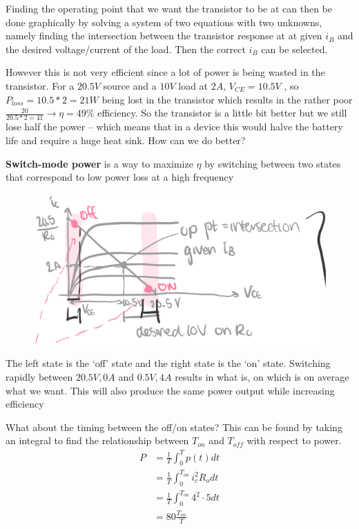 \documentclass[../notes.tex]{subfiles}
\begin{document}
Finding the operating point that we want the transistor to be at can then be done graphically by solving a system of two equations with two unknowns, namely finding the intersection between the transistor response at at given $ i_B $ and the desired voltage/current of the load. 
Then the correct $ i_B $ can be selected.

However this is not very efficient since a lot of power is being wasted in the transistor. For a $ 20.5V $ source and a $ 10V $   load at $ 2A $, $ V_{CE} = 10.5V$ , so $ P_{loss} = 10.5 * 2 = 21W $  being lost in the transistor which results in the rather poor $ \frac{20}{20.5 * 2 = 41} \rightarrow \eta = 49\%$  efficiency.
So the transistor is a little bit better but we still lose half the power -- which means that in a device this would halve the battery life and require a huge heat sink. How can we do better?



\textbf{Switch-mode power} is a way to maximize $ \eta $  by switching between two states that correspond to low power loss at a high frequency

\begin{figure}[H]
	\centering
	\includegraphics[width=0.8\linewidth]{img/image_2022-09-23-02-59-29.png}
\end{figure}

The left state is the `off' state and the right state is the `on' state. 
Switching rapidly between $ 20.5V, 0A $  and $ 0.5V, 4A$  results in what is, on which is on average what we want.
This will also produce the same power output while increasing efficiency


What about the timing between the off/on states? This can be found by taking an integral to find the relationship between $ T_{on} $  and $ T_{off} $  with respect to power.
\begin{equation}
	\begin{split}
		P &= \frac{1}{T} \int^T_0 p(t) dt\\
			&= \frac{1}{T} \int^{T_{on}}_0 i_c^2 R_o dt \\
			&= \frac{1}{T} \int^{T_{on}}_0 4^2 \cdot  5 dt \\
			&= 80 \frac{T_{on}}{T} \\
	\end{split}
\end{equation}
\end{document}
